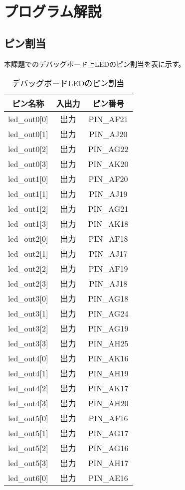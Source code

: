 \documentclass{ltjsarticle}
\begin{document}
\clearpage
\section{プログラム解説}
	\subsection{ピン割当}
		本課題でのデバッグボード上LEDのピン割当を表に示す。
		\begin{table}[H]
		\begin{center}
		\caption{デバッグボードLEDのピン割当}
		\label{tab:LEDpin}
		\begin{tabular}{cc|c} \toprule
			ピン名称&入出力&ピン番号\\ \hline
			led\_out0[0]&出力&PIN\_AF21\\
			led\_out0[1]&出力&PIN\_AJ20\\
			led\_out0[2]&出力&PIN\_AG22\\
			led\_out0[3]&出力&PIN\_AK20\\
			led\_out1[0]&出力&PIN\_AF20\\
			led\_out1[1]&出力&PIN\_AJ19\\
			led\_out1[2]&出力&PIN\_AG21\\
			led\_out1[3]&出力&PIN\_AK18\\
			led\_out2[0]&出力&PIN\_AF18\\
			led\_out2[1]&出力&PIN\_AJ17\\
			led\_out2[2]&出力&PIN\_AF19\\
			led\_out2[3]&出力&PIN\_AJ18\\
			led\_out3[0]&出力&PIN\_AG18\\
			led\_out3[1]&出力&PIN\_AG24\\
			led\_out3[2]&出力&PIN\_AG19\\
			led\_out3[3]&出力&PIN\_AH25\\
			led\_out4[0]&出力&PIN\_AK16\\
			led\_out4[1]&出力&PIN\_AH19\\
			led\_out4[2]&出力&PIN\_AK17\\
			led\_out4[3]&出力&PIN\_AH20\\
			led\_out5[0]&出力&PIN\_AF16\\
			led\_out5[1]&出力&PIN\_AG17\\
			led\_out5[2]&出力&PIN\_AG16\\
			led\_out5[3]&出力&PIN\_AH17\\
			led\_out6[0]&出力&PIN\_AE16\\

\end{tabular}
\end{center}
\end{table}
\end{document}
